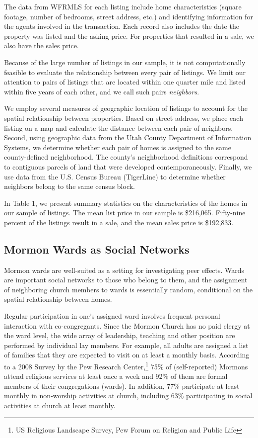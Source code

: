 \documentclass[12pt]{article}
\begin{document}
    The data from WFRMLS for each listing include home characteristics (square footage, number of bedrooms, street address, etc.) and identifying information for the agents involved in the transaction. Each record also includes the date the property was listed and the asking price. For properties that resulted in a sale, we also have the sales price.

    Because of the large number of listings in our sample, it is not computationally feasible to evaluate the relationship
    between every pair of listings. We limit our attention to pairs of listings that are located within one quarter mile and listed within five years of each
    other, and we call such pairs \emph{neighbors}.

    We employ several measures of geographic location of listings to account for the spatial relationship between properties.  Based on
    street address, we place each listing on a map and calculate the distance between each pair of
    neighbors.  Second, using geographic data from the Utah County Department of Information Systems, we determine whether each pair of homes is
    assigned to the same county-defined neighborhood. The county's neighborhood definitions correspond to contiguous parcels of land that were
    developed
    contemporaneously.  Finally, we use data from the U.S. Census Bureau (TigerLine) to determine whether neighbors belong to the same census block.

    In Table 1, we present summary statistics on the characteristics of the homes in our sample of listings. The mean list price in our sample is
    \$216,065.  Fifty-nine percent of the listings result in a sale, and the mean sales price is \$192,833.

\subsection*{Mormon Wards as Social Networks}

    Mormon wards are well-suited as a setting for investigating peer effects. Wards are important social networks to those who belong to
    them, and the assignment of neighboring church members to wards is essentially random, conditional on the spatial relationship between homes.

    Regular participation in one's assigned ward involves frequent personal interaction with
    co-congregants. Since the Mormon Church has no paid clergy at the ward level, the wide array of leadership, teaching and other position are performed by individual lay
    members. For example, all adults are assigned a list of families that they are expected to visit on at least a monthly basis. According to a 2008
    Survey by the Pew Research Center,\footnote{US Religious Landscape Survey, Pew Forum on Religion  and Public Life} 75\% of (self-reported) Mormons
    attend religious services at least once a week and 92\% of them are formal members of their congregations (wards). In addition, 77\% participate
    at least monthly
    in non-worship activities at church, including  63\% participating in social activities at church at least monthly.
\end{document}
